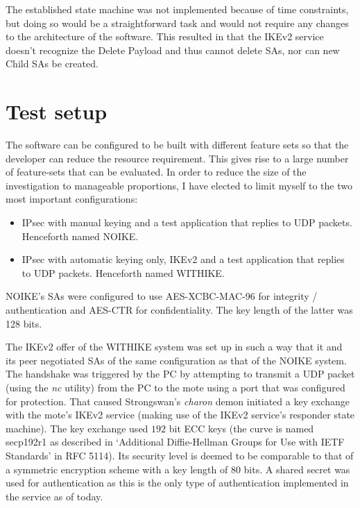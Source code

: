 \documentclass[final,a4paper,twoside,11pt,onecolumn]{report}
\begin{document}
The established state machine was not implemented because of time constraints, but doing so would be a straightforward task and would not require any changes to the architecture of the software. This resulted in that the IKEv2 service doesn't recognize the Delete Payload and thus cannot delete SAs, nor can new Child SAs be created.



\section{Test setup}
\label{sec:test-setup}
The software can be configured to be built with different feature sets so that the developer can reduce the resource requirement. This gives rise to a large number of feature-sets that can be evaluated. In order to reduce the size of the investigation to manageable proportions, I have elected to limit myself to the two most important configurations:

\begin{itemize}
   \item IPsec with manual keying and a test application that replies to UDP packets. Henceforth named NOIKE.
   \item IPsec with automatic keying only, IKEv2 and a test application that replies to UDP packets. Henceforth named WITHIKE.
\end{itemize}

NOIKE's SAs were configured to use AES-XCBC-MAC-96\cite{rfc3566} for integrity / authentication and AES-CTR\cite{rfc3686} for confidentiality. The key length of the latter was 128 bits.

The IKEv2 offer of the WITHIKE system was set up in such a way that it and its peer negotiated SAs of the same configuration as that of the NOIKE system. The handshake was triggered by the PC by attempting to transmit a UDP packet (using the \emph{nc} utility) from the PC to the mote using a port that was configured for protection. That caused Strongswan's \emph{charon} demon initiated a key exchange with the mote's IKEv2 service (making use of the IKEv2 service's responder state machine). The key exchange used $192$ bit ECC keys (the curve is named secp192r1 as described in `Additional Diffie-Hellman Groups for Use with IETF Standards' in RFC 5114\citep[p.5]{rfc5114}). Its security level is deemed to be comparable to that of a symmetric encryption scheme with a key length of 80 bits\citep[p.11]{rfc5114}. A shared secret was used for authentication as this is the only type of authentication implemented in the service as of today.
\end{document}
